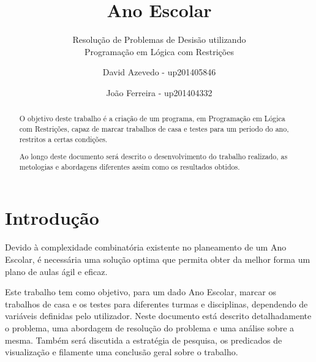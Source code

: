 \documentclass{llncs}
\begin{document}
%
\frontmatter          %
%
\pagestyle{headings}  %
%
\title{Ano Escolar}
\subtitle{Resolução de Problemas de Desisão utilizando\\
Programação em Lógica com Restrições}
%
%
\author{David Azevedo - up201405846 \and João Ferreira - up201404332}
%
%

\maketitle              %

\begin{abstract} %

O objetivo deste trabalho é a criação de um programa, em Programação em Lógica com Restrições, capaz de marcar trabalhos de casa e testes para um periodo do ano, restritos a certas condições.

Ao longo deste documento será descrito o desenvolvimento do trabalho realizado, as metologias e abordagens diferentes assim como os resultados obtidos.

\end{abstract}
%
\section{Introdução}
%
Devido à complexidade combinatória existente no planeamento de um Ano Escolar, é necessária uma solução optima que permita obter da melhor forma um plano de aulas ágil e eficaz.

Este trabalho tem como objetivo, para um dado Ano Escolar, marcar os trabalhos de casa e os testes para diferentes turmas e disciplinas, dependendo de variáveis definidas pelo utilizador.
Neste documento está descrito detalhadamente o problema, uma abordagem de resolução do problema e uma análise sobre a mesma. Também será discutida a estratégia de pesquisa, os predicados de visualização e filamente uma conclusão geral sobre o trabalho.
\end{document}
